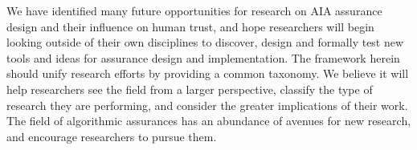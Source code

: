 We have identified many future opportunities for research on AIA assurance design and their influence on human trust, and hope researchers will begin looking outside of their own disciplines to discover, design and formally test new tools and ideas for assurance design and implementation. The framework herein should unify research efforts by providing a common taxonomy. We believe it will help researchers see the field from a larger perspective, classify the type of research they are performing, and consider the greater implications of their work. The field of algorithmic assurances has an abundance of avenues for new research, and encourage researchers to pursue them.